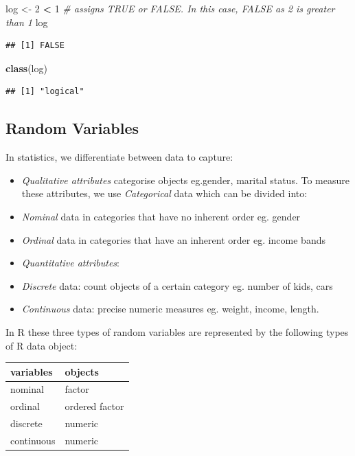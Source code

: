 \documentclass[]{book}
\newenvironment{Shaded}{\begin{snugshade}}{\end{snugshade}}
\newcommand{\KeywordTok}[1]{\textcolor[rgb]{0.13,0.29,0.53}{\textbf{#1}}}
\newcommand{\DecValTok}[1]{\textcolor[rgb]{0.00,0.00,0.81}{#1}}
\newcommand{\StringTok}[1]{\textcolor[rgb]{0.31,0.60,0.02}{#1}}
\newcommand{\CommentTok}[1]{\textcolor[rgb]{0.56,0.35,0.01}{\textit{#1}}}
\newcommand{\OperatorTok}[1]{\textcolor[rgb]{0.81,0.36,0.00}{\textbf{#1}}}
\newcommand{\NormalTok}[1]{#1}
\begin{document}
\begin{Shaded}
\begin{Highlighting}[]
\NormalTok{log <-}\StringTok{ }\DecValTok{2} \OperatorTok{<}\StringTok{ }\DecValTok{1} \CommentTok{# assigns TRUE or FALSE. In this case, FALSE as 2 is greater than 1}
\NormalTok{log}
\end{Highlighting}
\end{Shaded}

\begin{verbatim}
## [1] FALSE
\end{verbatim}

\begin{Shaded}
\begin{Highlighting}[]
\KeywordTok{class}\NormalTok{(log)}
\end{Highlighting}
\end{Shaded}

\begin{verbatim}
## [1] "logical"
\end{verbatim}

\subsection{Random Variables}\label{random-variables}

In statistics, we differentiate between data to capture:

\begin{itemize}
\item
  \emph{Qualitative attributes} categorise objects eg.gender, marital
  status. To measure these attributes, we use \emph{Categorical} data
  which can be divided into:
\item
  \emph{Nominal} data in categories that have no inherent order eg.
  gender
\item
  \emph{Ordinal} data in categories that have an inherent order eg.
  income bands
\item
  \emph{Quantitative attributes}:
\item
  \emph{Discrete} data: count objects of a certain category eg. number
  of kids, cars
\item
  \emph{Continuous} data: precise numeric measures eg. weight, income,
  length.
\end{itemize}

In R these three types of random variables are represented by the
following types of R data object:

\begin{tabular}{l|l}
\hline
variables & objects\\
\hline
nominal & factor\\
\hline
ordinal & ordered factor\\
\hline
discrete & numeric\\
\hline
continuous & numeric\\
\hline
\end{tabular}
\end{document}
